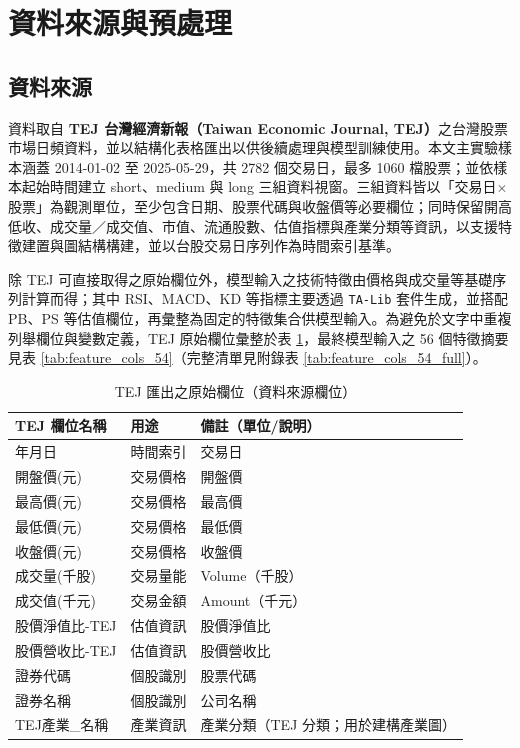 \FloatBarrier

\section{資料來源與預處理}
\label{sec:data}

\subsection{資料來源}
\label{subsec:data_source}
\FloatBarrier

資料取自 \textbf{TEJ 台灣經濟新報（Taiwan Economic Journal, TEJ）}之台灣股票市場日頻資料，並以結構化表格匯出以供後續處理與模型訓練使用。本文主實驗樣本涵蓋 2014-01-02 至 2025-05-29，共 2782 個交易日，最多 1060 檔股票；並依樣本起始時間建立 short、medium 與 long 三組資料視窗。三組資料皆以「交易日\(\times\)股票」為觀測單位，至少包含日期、股票代碼與收盤價等必要欄位；同時保留開高低收、成交量／成交值、市值、流通股數、估值指標與產業分類等資訊，以支援特徵建置與圖結構構建，並以台股交易日序列作為時間索引基準。

除 TEJ 可直接取得之原始欄位外，模型輸入之技術特徵由價格與成交量等基礎序列計算而得；其中 RSI、MACD、KD 等指標主要透過 \texttt{TA-Lib} 套件生成，並搭配 PB、PS 等估值欄位，再彙整為固定的特徵集合供模型輸入。為避免於文字中重複列舉欄位與變數定義，TEJ 原始欄位彙整於表 \ref{tab:tej_raw_fields}，最終模型輸入之 56 個特徵摘要見表 \ref{tab:feature_cols_54}（完整清單見附錄表 \ref{tab:feature_cols_54_full}）。

\begin{table}[H]
\centering
\small
\caption{TEJ 匯出之原始欄位（資料來源欄位）}
\label{tab:tej_raw_fields}
\begin{tabular}{lll}
\toprule
\textbf{TEJ 欄位名稱} & \textbf{用途} & \textbf{備註（單位/說明）} \\
\midrule
年月日 & 時間索引 & 交易日\\
開盤價(元) & 交易價格 & 開盤價\\
最高價(元) & 交易價格 & 最高價\\
最低價(元) & 交易價格 & 最低價\\
收盤價(元) & 交易價格 & 收盤價\\
成交量(千股) & 交易量能 & Volume（千股）\\
成交值(千元) & 交易金額 & Amount（千元）\\
股價淨值比-TEJ & 估值資訊 & 股價淨值比\\
股價營收比-TEJ & 估值資訊 & 股價營收比\\
證券代碼 & 個股識別 & 股票代碼\\
證券名稱 & 個股識別 & 公司名稱\\
TEJ產業\_名稱 & 產業資訊 & 產業分類（TEJ 分類；用於建構產業圖）\\
\bottomrule
\end{tabular}
\end{table}

